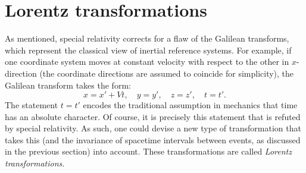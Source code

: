 \section{Lorentz transformations}
As mentioned, special relativity corrects for a flaw of the Galilean transforms, which represent the classical view of inertial reference systems. For example, if one coordinate system moves at constant velocity  with respect to the other in \(x\)-direction (the coordinate directions are assumed to coincide for simplicity), the Galilean transform takes the form:
\begin{equation}
    x = x' + Vt, \quad y = y', \quad z = z',\quad t = t'.
    \label{eq:galilean_transform}
\end{equation}
The statement \(t = t'\) encodes the traditional assumption in mechanics that time has an absolute character. Of course, it is precisely this statement that is refuted by special relativity. As such, one could devise a new type of transformation that takes this (and the invariance of spacetime intervals between events, as discussed in the previous section) into account. These transformations are called \emph{Lorentz transformations}. 

